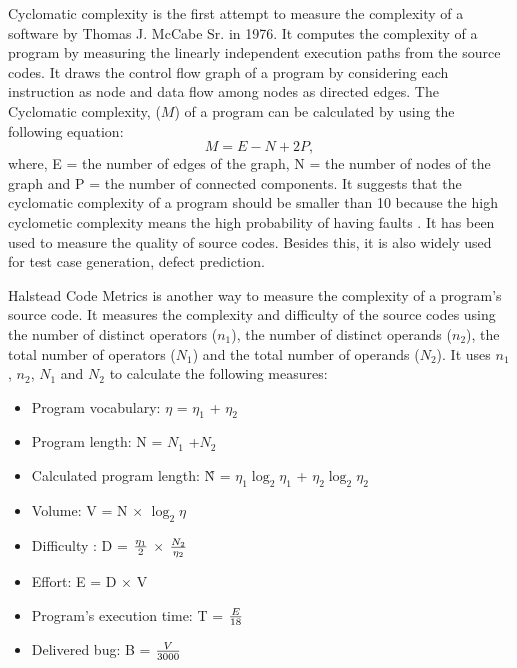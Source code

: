 \documentclass[12pt]{report}
\begin{document}
Cyclomatic complexity is the first attempt to measure the complexity of a software by Thomas J. McCabe Sr. in 1976\cite{mccabe1976complexity}. It computes the complexity of a program by measuring the linearly independent execution paths from the source codes. It draws the control flow graph of a program by considering each instruction as node and data flow among nodes as directed edges. The Cyclomatic complexity, ($M$) of a program can be calculated by using the following equation:  
	\[M = E − N + 2P,\] where,
E = the number of edges of the graph,
N = the number of nodes of the graph and 
P = the number of connected components.
It suggests that the cyclomatic complexity of a program should be smaller than 10 because the high cyclometic complexity means the high probability of having faults \cite{mccabe1976complexity}. It has been used to measure the quality of source codes. Besides this, it is also widely used for test case generation, defect prediction.

Halstead Code Metrics \cite{halstead1977elements} is another way to measure the complexity of a program's source code. It measures the complexity and difficulty of the source codes using the number of distinct operators ($n_{1}$), the number of distinct operands ($n_{2}$), the total number of operators ($N_{1}$) and the total number of operands ($N_{2}$). It uses $n_{1}$, $n_{2}$, $N_{1}$ and $N_{2}$ to calculate the following measures: 

\begin{itemize}
	\item Program vocabulary: $\eta$ = $\eta_1$ + $\eta_2$ \,
	\item Program length: N = $N_1$ +$N_2$ \,
	\item Calculated program length: \^{N} = $\eta_1 \log_2 \eta_1$ + $\eta_2 \log_2 \eta_2$ \, 
	\item Volume: V = N $\times$ $\log_2 \eta$ \,
	\item Difficulty : D = { $\eta_1 \over 2 $ } $\times$ { $N_2 \over \eta_2$ } \,
	\item Effort: E =  D $\times$ V \,
	\item Program’s execution time: T = {$E \over 18$}\,
	\item Delivered bug: B = {$V \over 3000$} \,
\end{itemize}
\end{document}
